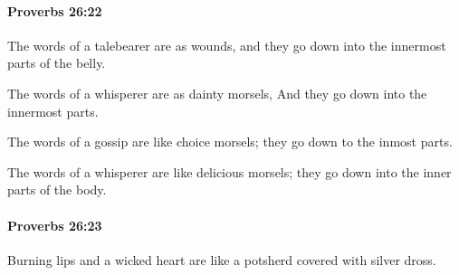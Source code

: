 		\paragraph{Proverbs 26:22} %
			\label{PROVERBS-26-22}

			The words of a talebearer are as wounds, and they go down into the innermost parts of the belly.

			\begin{versebox}
					\item[BHS] 
					\item[ASV] The words of a whisperer are as dainty morsels, And they go down into the innermost parts.
					\item[NIV] The words of a gossip are like choice morsels; they go down to the inmost parts.
					\item[NRSV] The words of a whisperer are like delicious morsels; they go down into the inner parts of the body.
			\end{versebox}

		\paragraph{Proverbs 26:23} %
			\label{PROVERBS-26-23}

			Burning lips and a wicked heart are like a potsherd covered with silver dross.

